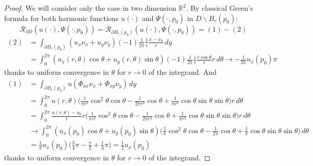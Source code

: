 \documentclass[10pt, a4paper, twoside, openright]{book}
\theoremstyle{definition}
\theoremstyle{plain}
\theoremstyle{plain}
\theoremstyle{plain}
\theoremstyle{plain}
\theoremstyle{plain}
\theoremstyle{plain}
\theoremstyle{plain}
\theoremstyle{plain}
\begin{document}
\begin{proof}
 We will consider only the case in two dimension $\mathbb{R}^2$.
 By classical Green's formula for both harmonic functions $u(\cdot)$ and $\Psi(\cdot,p_0)$ in $D\backslash B_r(p_0)$:
 \[\mathcal{R}_{\partial D}(u(\cdot),\Psi(\cdot,p_0)) = \mathcal{R}_{\partial B_r(p_0)}(u(\cdot),\Psi(\cdot,p_0)) = (1) - (2)\]
 \begin{equation}
 \begin{align}
 (2)&=\int_{\partial B_r(p_0)}(u_x\nu_x+u_y\nu_y)(-1)\frac{1}{2\pi}\frac{1}{r}\frac{x-x_0}{r}\,dy\\
 &= \int_0^{2\pi}(u_x(r,\theta)\cos\theta+u_y(r,\theta)\sin\theta)(-1)\frac{1}{2\pi}\frac{1}{r}\frac{r\cos\theta}{r}r\,d\theta \to -\frac{1}{2\pi}u_x(p_0)\pi
 \end{align}
 \end{equation}
 thanks to uniform convergence in $\theta$ for $r\to0$ of the integrand. And
 \begin{equation}
 \begin{align}
 (1)&=\int_{\partial B_r(p_0)}u(\Phi_{xx}\nu_x + \Phi_{xy}\nu_y)\,dy\\
 &= \int_0^{2\pi}u(r,\theta)\Big(\frac{1}{\pi r^2}\cos^2\theta\cos\theta - \frac{1}{2\pi r^2}\cos\theta + \frac{1}{\pi r^2}\cos\theta\sin\theta\sin\theta\Big)r\,d\theta\\
 &= \int_0^{2\pi}\frac{u(r,\theta)-u_0}{r}r\Big(\frac{1}{\pi r^2}\cos^2\theta\cos\theta - \frac{1}{2\pi r^2}\cos\theta + \frac{1}{\pi r^2}\cos\theta\sin\theta\sin\theta\Big)r\,d\theta\\
 & \to \int_0^{2\pi}(u_x(p_0)\cos\theta + u_y(p_0)\sin\theta)\Big(\frac{1}{\pi}\cos^2\theta\cos\theta - \frac{1}{2\pi}\cos\theta + \frac{1}{\pi}\cos\theta\sin\theta\sin\theta\Big)\,d\theta\\
 &= \frac{1}{\pi}u_x(p_0)\Big(\frac{3}{4}\pi-\frac{\pi}{2}+\frac{1}{4}\pi\Big) = \frac{1}{2}u_x(p_0)
 \end{align}
 \end{equation}
 thanks to uniform convergence in $\theta$ for $r\to0$ of the integrand.
\end{proof}
% 
\end{document}
